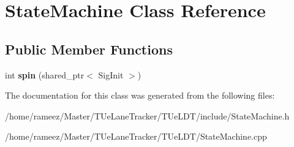 \hypertarget{classStateMachine}{\section{State\-Machine Class Reference}
\label{classStateMachine}
}
\subsection*{Public Member Functions}
\begin{DoxyCompactItemize}
\item 
\hypertarget{classStateMachine_a3dd8562cc7ad040b2392db8771165c7e}{int {\bfseries spin} (shared\-\_\-ptr$<$ Sig\-Init $>$)}\label{classStateMachine_a3dd8562cc7ad040b2392db8771165c7e}

\end{DoxyCompactItemize}


The documentation for this class was generated from the following files\-:\begin{DoxyCompactItemize}
\item 
/home/rameez/\-Master/\-T\-Ue\-Lane\-Tracker/\-T\-Ue\-L\-D\-T/include/State\-Machine.\-h\item 
/home/rameez/\-Master/\-T\-Ue\-Lane\-Tracker/\-T\-Ue\-L\-D\-T/State\-Machine.\-cpp\end{DoxyCompactItemize}
